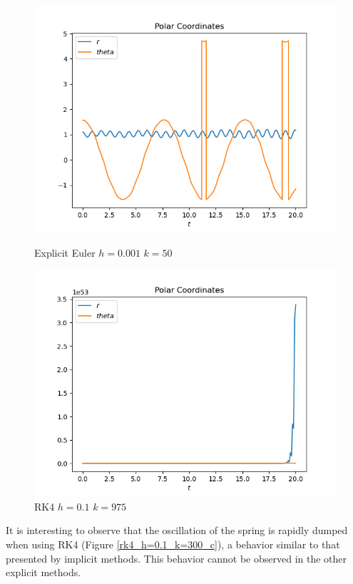 \documentclass{report}
\begin{document}
\begin{figure}[h]
\centering
\begin{minipage}[b]{0.45\textwidth}
\centering
\includegraphics[width=\textwidth]{../Plots/ExpEuler/exp_euler_k=50_h=0.001_c}
\caption{Explicit Euler $h=0.001$ $k=50$}
\label{exp_euler_k=50_h=0.001_c_2}
\end{minipage}
\hfill
\begin{minipage}[b]{0.45\textwidth}
\centering
\includegraphics[width=\textwidth]{../Plots/RK4/rk4_h=0.1_k=975_c}
\caption{RK4 $h=0.1$ $k=975$}
\label{rk4_h=0.1_k=975_c}
\end{minipage}
\end{figure}

It is interesting to observe that the oscillation of the spring is rapidly dumped when using RK4 (Figure \ref{rk4_h=0.1_k=300_c}), a behavior similar to that presented by implicit methods.
This behavior cannot be observed in the other explicit methods.
\end{document}
